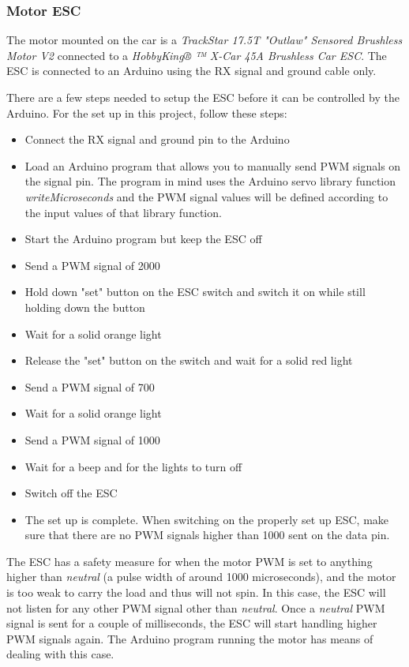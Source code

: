 \documentclass[11pt, titlepage]{article} %
\begin{document}
\subsubsection{Motor ESC}
The motor mounted on the car is a \textit{TrackStar 17.5T "Outlaw" Sensored Brushless Motor V2} connected to a \textit{HobbyKing® ™ X-Car 45A Brushless Car ESC}. The ESC is connected to an Arduino using the RX signal and ground cable only.

There are a few steps needed to setup the ESC before it can be controlled by the Arduino. For the set up in this project, follow these steps:
\begin{itemize}
	\item Connect the RX signal and ground pin to the Arduino
	\item Load an Arduino program that allows you to manually send PWM signals on the signal pin. The program in mind uses the Arduino servo library function \textit{writeMicroseconds} and the PWM signal values will be defined according to the input values of that library function.
	\item Start the Arduino program but keep the ESC off
	\item Send a PWM signal of 2000
	\item Hold down "set" button on the ESC switch and switch it on while still holding down the button
	\item Wait for a solid orange light
	\item Release the "set" button on the switch and wait for a solid red light
	\item Send a PWM signal of 700
	\item Wait for a solid orange light
	\item Send a PWM signal of 1000
	\item Wait for a beep and for the lights to turn off
	\item Switch off the ESC
	\item The set up is complete. When switching on the properly set up ESC, make sure that there are no PWM signals higher than 1000 sent on the data pin.
\end{itemize}

The ESC has a safety measure for when the motor PWM is set to anything higher than \textit{neutral} (a pulse width of around 1000 microseconds), and the motor is too weak to carry the load and thus will not spin. In this case, the ESC will not listen for any other PWM signal other than \textit{neutral}. Once a \textit{neutral} PWM signal is sent for a couple of milliseconds, the ESC will start handling higher PWM signals again. The Arduino program running the motor has means of dealing with this case.
\end{document}
